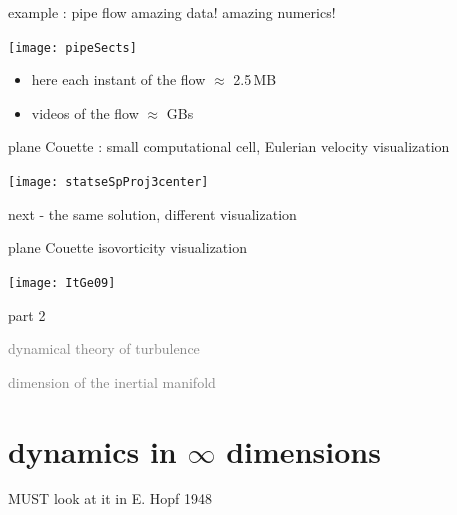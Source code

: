 \begin{frame}{example : pipe flow}
amazing data! amazing numerics!
\begin{center}
  \texttt{[image: pipeSects]}
\end{center}

\begin{itemize}
 \item here each instant of the flow $\approx$ 2.5\,MB
 \item videos of the flow $\approx$ GBs
\end{itemize}
\end{frame}

\begin{frame}{plane Couette : small computational cell, Eulerian velocity visualization}
\begin{center}
\texttt{[image: statseSpProj3center]}
\end{center}
next - the same solution, different visualization
\end{frame}

\begin{frame}{plane Couette isovorticity visualization}
\begin{center}
\texttt{[image: ItGe09]}
\end{center}
\end{frame}


\begin{frame}{part 2}
\begin{enumerate}
              \item
    \textcolor{gray}{\small
dynamical theory of turbulence
        }
              \item
    {\Large
\statesp
    }\textcolor{gray}{\small
              \item
dimension of the inertial manifold
                    }
            \end{enumerate}
\end{frame}


\section[dynamics in $\infty$ dimensions]
{dynamics in $\infty$ dimensions}

\begin{frame}{{\Large MUST} look at it in}
\bigskip
\hfill
{\Huge \statesp}
\vfill
E. Hopf 1948
\end{frame}


